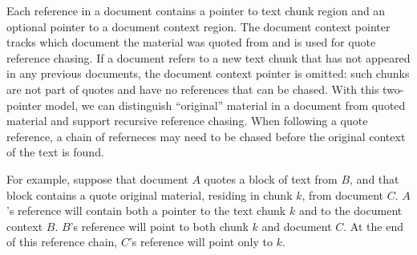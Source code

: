 \documentclass{acm_proc_article-sp}
\begin{document}
Each reference in a document contains a pointer to text chunk region and an optional pointer to a document context region.
The document context pointer tracks which document the material was quoted from and is used for quote reference chasing.
If a document refers to a new text chunk that has not appeared in any previous documents, the document context pointer is omitted:  such chunks are not part of quotes and have no references that can be chased.
With this two-pointer model, we can distinguish ``original'' material in a document from quoted material and support recursive reference chasing.
When following a quote reference, a chain of referneces may need to be chased before the original context of the text is found. 

For example, suppose that document $A$ quotes a block of text from $B$, and that block contains a quote original material, residing in chunk $k$, from document $C$.  
$A$'s reference will contain both a pointer to the text chunk $k$ and to the document context $B$.  
$B$'s reference will point to both chunk $k$ and document $C$.  
At the end of this reference chain, $C$'s reference will point only to $k$.   
\end{document}
